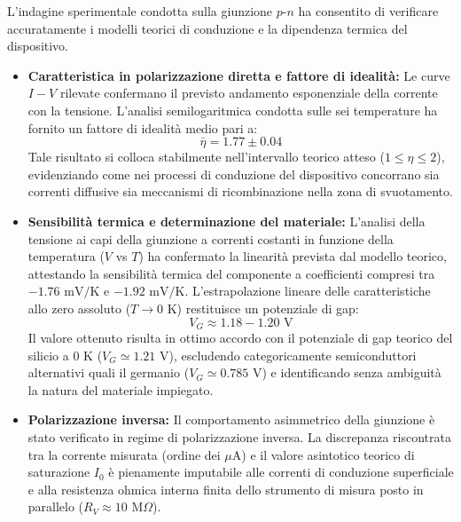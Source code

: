 \documentclass[a4paper,11pt]{article}
\begin{document}
L'indagine sperimentale condotta sulla giunzione $p\text{-}n$ ha consentito di verificare accuratamente i modelli teorici di conduzione e la dipendenza termica del dispositivo.

\begin{itemize}
    \item \textbf{Caratteristica in polarizzazione diretta e fattore di idealità:} Le curve $I-V$ rilevate confermano il previsto andamento esponenziale della corrente con la tensione. L'analisi semilogaritmica condotta sulle sei temperature ha fornito un fattore di idealità medio pari a:
    \begin{equation*}
        \bar{\eta} = 1.77 \pm 0.04
    \end{equation*}
    Tale risultato si colloca stabilmente nell'intervallo teorico atteso ($1 \le \eta \le 2$), evidenziando come nei processi di conduzione del dispositivo concorrano sia correnti diffusive sia meccanismi di ricombinazione nella zona di svuotamento.

    \item \textbf{Sensibilità termica e determinazione del materiale:} L'analisi della tensione ai capi della giunzione a correnti costanti in funzione della temperatura ($V$ vs $T$) ha confermato la linearità prevista dal modello teorico, attestando la sensibilità termica del componente a coefficienti compresi tra $-1.76\text{ mV/K}$ e $-1.92\text{ mV/K}$. L'estrapolazione lineare delle caratteristiche allo zero assoluto ($T \to 0\text{ K}$) restituisce un potenziale di gap:
    \begin{equation*}
        V_G \approx 1.18 - 1.20\text{ V}
    \end{equation*}
    Il valore ottenuto risulta in ottimo accordo con il potenziale di gap teorico del silicio a $0\text{ K}$ ($V_G \simeq 1.21\text{ V}$), escludendo categoricamente semiconduttori alternativi quali il germanio ($V_G \simeq 0.785\text{ V}$) e identificando senza ambiguità la natura del materiale impiegato.

    \item \textbf{Polarizzazione inversa:} Il comportamento asimmetrico della giunzione è stato verificato in regime di polarizzazione inversa. La discrepanza riscontrata tra la corrente misurata (ordine dei $\mu\text{A}$) e il valore asintotico teorico di saturazione $I_0$ è pienamente imputabile alle correnti di conduzione superficiale e alla resistenza ohmica interna finita dello strumento di misura posto in parallelo ($R_V \approx 10\text{ M}\Omega$).
\end{itemize}
\end{document}
